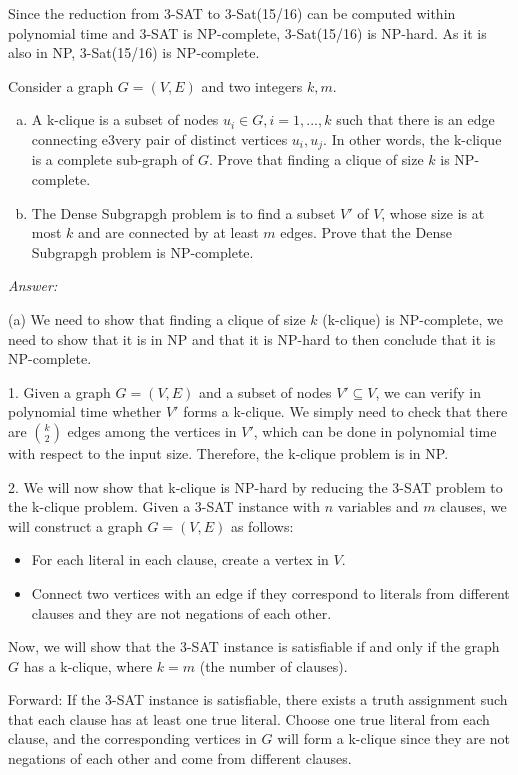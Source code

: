 \documentclass[12pt]{article}
\newenvironment{problem}[2][Problem]{\begin{trivlist}
\item[\hskip \labelsep {\bfseries #1}\hskip \labelsep {\bfseries #2.}]}{\end{trivlist}}
\begin{document}
Since the reduction from 3-SAT to 3-Sat(15/16) can be computed within polynomial time and 3-SAT is NP-complete, 3-Sat(15/16) is NP-hard. As it is also in NP, 3-Sat(15/16) is NP-complete.
\begin{problem}{2}
    Consider a graph $G=(V,E)$ and two integers $k,m$.
    \begin{enumerate}[(a)]
        \item A k-clique is a subset of nodes $u_i \in G, i=1,...,k$ such that there is an edge connecting e3very pair of distinct vertices $u_i, u_j$. In other words, the k-clique is a complete sub-graph of $G$. Prove that finding a clique of size $k$ is NP-complete.
        \item The Dense Subgrapgh problem is to find a subset $V'$ of $V$, whose size is at most $k$ and are connected by at least $m$ edges. Prove that the Dense Subgrapgh problem is NP-complete.
    \end{enumerate}
\end{problem}

\textit{Answer:}

(a) We need to show that finding a clique of size $k$ (k-clique) is NP-complete, we need to show that it is in NP and that it is NP-hard to then conclude that it is NP-complete.

1. Given a graph $G=(V,E)$ and a subset of nodes $V' \subseteq V$, we can verify in polynomial time whether $V'$ forms a k-clique. We simply need to check that there are ${k \choose 2}$ edges among the vertices in $V'$, which can be done in polynomial time with respect to the input size. Therefore, the k-clique problem is in NP.

2. We will now show that k-clique is NP-hard by reducing the 3-SAT problem to the k-clique problem. Given a 3-SAT instance with $n$ variables and $m$ clauses, we will construct a graph $G=(V,E)$ as follows:

\begin{itemize}
    \item For each literal in each clause, create a vertex in $V$.
    \item Connect two vertices with an edge if they correspond to literals from different clauses and they are not negations of each other.
\end{itemize}

Now, we will show that the 3-SAT instance is satisfiable if and only if the graph $G$ has a k-clique, where $k = m$ (the number of clauses).

Forward: If the 3-SAT instance is satisfiable, there exists a truth assignment such that each clause has at least one true literal. Choose one true literal from each clause, and the corresponding vertices in $G$ will form a k-clique since they are not negations of each other and come from different clauses.
\end{document}
